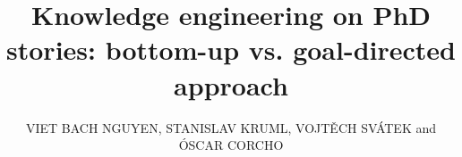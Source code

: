 \documentclass{kerauth}
\begin{document}

\title{Knowledge engineering on PhD stories: bottom-up vs. goal-directed approach}
\author{VIET BACH NGUYEN,
STANISLAV KRUML, 
VOJT\v{E}CH SV\'{A}TEK and 
ÓSCAR CORCHO}
\address{Prague University of Economics and Business, N\'{a}m. W. Churchilla 4, 130 67 Praha 3, Czech Republic\\
\\
Universidad Politécnica de Madrid, Madrid, Spain\\
}
\end{document}
